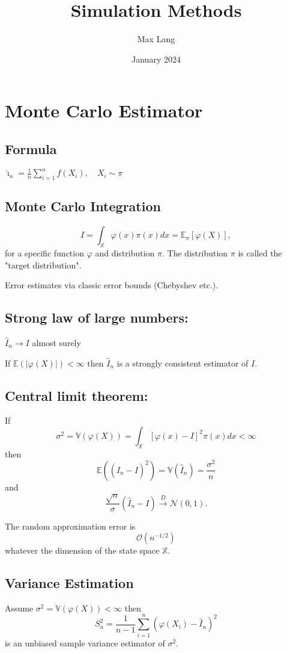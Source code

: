 \documentclass{article}
\title{Simulation Methods}
\author{Max Lang}
\date{January 2024}
\begin{document}
\maketitle
\section{Monte Carlo Estimator}
\subsection{Formula}
$\hat{\imath}_n=\frac{1}{n} \sum_{i=1}^n f\left(X_i\right), \quad X_i \sim \pi$

\subsection{Monte Carlo Integration}
$$
I=\int_{\mathbb{X}} \varphi(x) \pi(x) d x=\mathbb{E}_\pi[\varphi(X)],
$$
for a specific function $\varphi$ and distribution $\pi$.
The distribution $\pi$ is  called the "target distribution".

Error estimates via classic error bounds (Chebyshev etc.).

\subsection{Strong law of large numbers: }
$\widehat{I}_n \rightarrow I$ almost surely

If $\mathbb{E}(|\varphi(X)|)<\infty$ then $\widehat{I}_n$ is a strongly consistent estimator of $I$.

\subsection{Central limit theorem:} 
If
$$
\sigma^2=\mathbb{V}(\varphi(X))=\int_{\mathbb{X}}[\varphi(x)-I]^2 \pi(x) d x<\infty
$$
then
$$
\mathbb{E}\left(\left(\hat{I}_n-I\right)^2\right)=\mathbb{V}\left(\hat{I}_n\right)=\frac{\sigma^2}{n}
$$
and
$$
\frac{\sqrt{n}}{\sigma}\left(\hat{I}_n-I\right) \xrightarrow{D} \mathcal{N}(0,1) .
$$

The random approximation error is
$$
\mathcal{O}\left(n^{-1 / 2}\right)
$$
whatever the dimension of the state space $\mathbb{X}$.

\subsection{Variance Estimation}
Assume $\sigma^2=\mathbb{V}(\varphi(X))<\infty$ then
$$
S_n^2=\frac{1}{n-1} \sum_{i=1}^n\left(\varphi\left(X_i\right)-\widehat{I}_n\right)^2
$$
is an unbiased sample variance estimator of $\sigma^2$.
\end{document}
